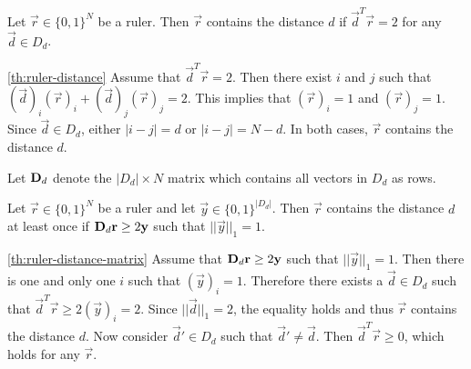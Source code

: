 \documentclass[a4paper, openany, oneside]{memoir}
\begin{document}
\begin{blockTheorem} \label{th:ruler-distance}\nolinebreak
    Let $\vec{r} \in \{0,1\}^N$ be a ruler. Then $\vec{r}$ contains the distance $d$ if $\vec{d}^T \vec{r} = 2$ for any $\vec{d} \in D_d$.\nolinebreak
\end{blockTheorem}

\begin{blockProofTheorem}{\ref{th:ruler-distance}}
    Assume that $\vec{d}^T\vec{r} = 2$. Then there exist $i$ and $j$ such that $(\vec{d})_i (\vec{r})_i + (\vec{d})_j (\vec{r})_j = 2$. This implies that $(\vec{r})_i = 1$ and $(\vec{r})_j = 1$. Since $\vec{d} \in D_d$, either $|i-j|=d$ or $|i-j| = N-d$. In both cases, $\vec{r}$ contains the distance $d$. 
\end{blockProofTheorem}

Let $\boldsymbol{\mathbf{D}}_d$ denote the $|D_d| \times N$ matrix which contains all vectors in $D_d$ as rows.

\begin{blockTheorem} \label{th:ruler-distance-matrix}\nolinebreak
    Let $\vec{r} \in \{0,1\}^N$ be a ruler and let $\vec{y} \in \{0,1\}^{|D_d|}$. Then $\vec{r}$ contains the distance $d$ at least once if $\boldsymbol{\mathbf{D}}_d \boldsymbol{\mathbf{r}} \ge 2\boldsymbol{\mathbf{y}}$ such that $||\vec{y}||_1 = 1$.
\end{blockTheorem}

\begin{blockProofTheorem}{\ref{th:ruler-distance-matrix}}
    Assume that $\boldsymbol{\mathbf{D}}_d \boldsymbol{\mathbf{r}} \ge 2 \boldsymbol{\mathbf{y}}$ such that $||\vec{y}||_1 = 1$. Then there is one and only one $i$ such that $(\vec{y})_i=1$. Therefore there exists a $\vec{d} \in D_d$ such that $\vec{d}^T \vec{r} \ge 2 (\vec{y})_i = 2$. Since $||\vec{d}||_1=2$, the equality holds and thus $\vec{r}$ contains the distance $d$. Now consider $\vec{d}' \in D_d$ such that $\vec{d}' \neq \vec{d}$. Then $\vec{d}^T \vec{r} \ge 0$, which holds for any $\vec{r}$.  
\end{blockProofTheorem}
\end{document}
